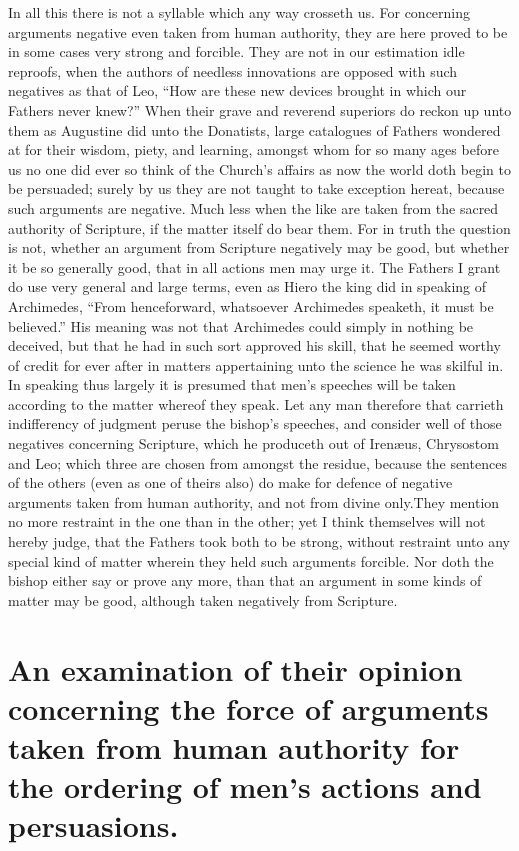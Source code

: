In all this there is not a syllable which any way crosseth us. For concerning arguments negative even taken from human authority, they are here proved to be in some cases very strong and forcible. They are not in our estimation idle reproofs, when the authors of needless innovations are opposed with such negatives as that of Leo, “How are these new devices brought in which our Fathers never knew?” When their grave and reverend superiors do reckon up unto them as Augustine did unto the Donatists, large catalogues of Fathers wondered at for their wisdom, piety, and learning, amongst  whom for so many ages before us no one did ever so think of the Church’s affairs as now the world doth begin to be persuaded; surely by us they are not taught to take exception hereat, because such arguments are negative. Much less when the like are taken from the sacred authority of Scripture, if the matter itself do bear them. For in truth the question is not, whether an argument from Scripture negatively may be good, but whether it be so generally good, that in all actions men may urge it. The Fathers I grant do use very general and large terms, even as Hiero the king did in speaking of Archimedes, “From henceforward, whatsoever Archimedes speaketh, it must be believed.” His meaning was not that Archimedes could simply in nothing be deceived, but that he had in such sort approved his skill, that he seemed worthy of credit for ever after in matters appertaining unto the science he was skilful in. In speaking thus largely it is presumed that men’s speeches will be taken according to the matter whereof they speak. Let any man therefore that carrieth indifferency of judgment peruse the bishop’s speeches, and consider well of those negatives concerning Scripture, which he produceth out of Irenæus, Chrysostom and Leo;  which three are chosen from amongst the residue, because the sentences of the others (even as one of theirs also) do make for defence of negative arguments taken from human authority, and not from divine only.They mention no more restraint in the one than in the other; yet I think themselves will not hereby judge, that the Fathers took both to be strong, without restraint unto any special kind of matter wherein they held such arguments forcible. Nor doth the bishop either say or prove any more, than that an argument in some kinds of matter may be good, although taken negatively from Scripture.

\section*{An examination of their opinion concerning the force of arguments taken from human authority for the ordering of men’s actions and persuasions.}

